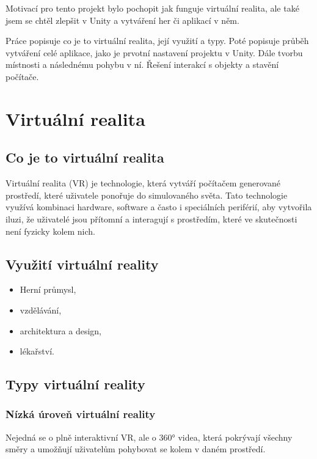 \documentclass[12pt, a4paper,
twoside,        %
openright
]{report}
\let\oldchapter\chapter
\renewcommand{\chapter}{
	\clearpage
	\pagestyle{fancy}
	\oldchapter
}
\begin{document}
	Motivací pro tento projekt bylo pochopit jak funguje virtuální realita, ale také jsem se chtěl zlepšit v Unity a vytváření her či aplikací v něm.
	
	Práce popisuje co je to virtuální realita, její využití a typy. Poté popisuje průběh vytváření celé aplikace, jako je prvotní nastavení projektu v Unity. Dále tvorbu místnosti a následnému pohybu v ní. Řešení interakcí s objekty a stavění počítače.


\chapter{Virtuální realita}

\section{Co je to virtuální realita}
\label{sec:co_je_VR}
Virtuální realita (VR) je technologie, která vytváří počítačem generované prostředí, které uživatele ponořuje do simulovaného světa. Tato technologie využívá kombinaci hardware, software a často i speciálních periférií, aby vytvořila iluzi, že uživatelé jsou přítomní a interagují s prostředím, které ve skutečnosti není fyzicky kolem nich.


\section{Využití virtuální reality}
\label{sec:vyuziti_VR}


\begin{itemize}
	\item Herní průmysl,
	\item vzdělávání,
	\item architektura a design,
	\item lékařství.
\end{itemize}


\section{Typy virtuální reality}
\label{sec:typy_VR}


\subsection{Nízká úroveň virtuální reality}
Nejedná se o plně interaktivní VR, ale o 360° videa, která pokrývají všechny směry a umožňují uživatelům pohybovat se kolem v daném prostředí. 
\end{document}
